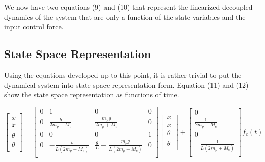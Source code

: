 \documentclass[titlepage]{article}
\begin{document}
We now have two equations (9) and (10) that represent the linearized decoupled dynamics of the system that are only a function of the state variables and the input control force.

\subsection{State Space Representation}

Using the equations developed up to this point, it is rather trivial to put the dynamical system into state space representation form.
Equation (11) and (12) show the state space representation as functions of time.

\begin{equation}
\begin{bmatrix}
\dot{x}\\
\ddot{x}\\
\dot{\theta}\\
\ddot{\theta}\\
\end{bmatrix} =
\begin{bmatrix}
0 & 1  & 0 & 0\\
0 & \frac{b}{2m_{p} + M_{c}}  & \frac{m_{p}g}{2m_{p} + M_{c}} & 0\\
0 & 0  & 0 & 1\\
0 & -\frac{b}{L\left(2m_{p} + M_{c}\right)}  & \frac{g}{L} - \frac{m_{p}g}{L\left(2m_{p} + M_{c}\right)} & 0\\
\end{bmatrix}
\begin{bmatrix}
x\\
\dot{x}\\
\theta\\
\dot{\theta}\\
\end{bmatrix}+ \begin{bmatrix}
0\\
\frac{1}{2m_{p} + M_{c}}\\
0\\
-\frac{1}{L\left(2m_{p} + M_{c}\right)}\\
\end{bmatrix} f_{c}\left(t\right)
\end{equation}
\end{document}
